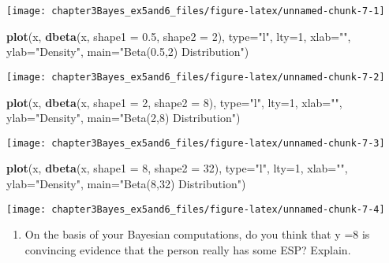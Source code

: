 \documentclass[]{tufte-handout}
\newenvironment{Shaded}{}{}
\newcommand{\KeywordTok}[1]{\textcolor[rgb]{0.00,0.44,0.13}{\textbf{{#1}}}}
\newcommand{\DataTypeTok}[1]{\textcolor[rgb]{0.56,0.13,0.00}{{#1}}}
\newcommand{\DecValTok}[1]{\textcolor[rgb]{0.25,0.63,0.44}{{#1}}}
\newcommand{\FloatTok}[1]{\textcolor[rgb]{0.25,0.63,0.44}{{#1}}}
\newcommand{\StringTok}[1]{\textcolor[rgb]{0.25,0.44,0.63}{{#1}}}
\newcommand{\NormalTok}[1]{{#1}}
\begin{document}
\texttt{[image: chapter3Bayes\_ex5and6\_files/figure-latex/unnamed-chunk-7-1]}

\begin{Shaded}
\begin{Highlighting}[]
\KeywordTok{plot}\NormalTok{(x, }\KeywordTok{dbeta}\NormalTok{(x, }\DataTypeTok{shape1 =} \FloatTok{0.5}\NormalTok{, }\DataTypeTok{shape2 =} \DecValTok{2}\NormalTok{), }\DataTypeTok{type=}\StringTok{"l"}\NormalTok{, }\DataTypeTok{lty=}\DecValTok{1}\NormalTok{, }\DataTypeTok{xlab=}\StringTok{""}\NormalTok{, }\DataTypeTok{ylab=}\StringTok{"Density"}\NormalTok{, }\DataTypeTok{main=}\StringTok{"Beta(0.5,2) Distribution"}\NormalTok{)}
\end{Highlighting}
\end{Shaded}

\texttt{[image: chapter3Bayes\_ex5and6\_files/figure-latex/unnamed-chunk-7-2]}

\begin{Shaded}
\begin{Highlighting}[]
\KeywordTok{plot}\NormalTok{(x, }\KeywordTok{dbeta}\NormalTok{(x, }\DataTypeTok{shape1 =} \DecValTok{2}\NormalTok{, }\DataTypeTok{shape2 =} \DecValTok{8}\NormalTok{), }\DataTypeTok{type=}\StringTok{"l"}\NormalTok{, }\DataTypeTok{lty=}\DecValTok{1}\NormalTok{, }\DataTypeTok{xlab=}\StringTok{""}\NormalTok{, }\DataTypeTok{ylab=}\StringTok{"Density"}\NormalTok{, }\DataTypeTok{main=}\StringTok{"Beta(2,8) Distribution"}\NormalTok{)}
\end{Highlighting}
\end{Shaded}

\texttt{[image: chapter3Bayes\_ex5and6\_files/figure-latex/unnamed-chunk-7-3]}

\begin{Shaded}
\begin{Highlighting}[]
\KeywordTok{plot}\NormalTok{(x, }\KeywordTok{dbeta}\NormalTok{(x, }\DataTypeTok{shape1 =} \DecValTok{8}\NormalTok{, }\DataTypeTok{shape2 =} \DecValTok{32}\NormalTok{), }\DataTypeTok{type=}\StringTok{"l"}\NormalTok{, }\DataTypeTok{lty=}\DecValTok{1}\NormalTok{, }\DataTypeTok{xlab=}\StringTok{""}\NormalTok{, }\DataTypeTok{ylab=}\StringTok{"Density"}\NormalTok{, }\DataTypeTok{main=}\StringTok{"Beta(8,32) Distribution"}\NormalTok{)}
\end{Highlighting}
\end{Shaded}

\texttt{[image: chapter3Bayes\_ex5and6\_files/figure-latex/unnamed-chunk-7-4]}

\begin{enumerate}
\def\labelenumi{\alph{enumi})}
\setcounter{enumi}{3}
\itemsep1pt\parskip0pt
\item
  On the basis of your Bayesian computations, do you think that y =8 is
  convincing evidence that the person really has some ESP? Explain.
\end{enumerate}
\end{document}

